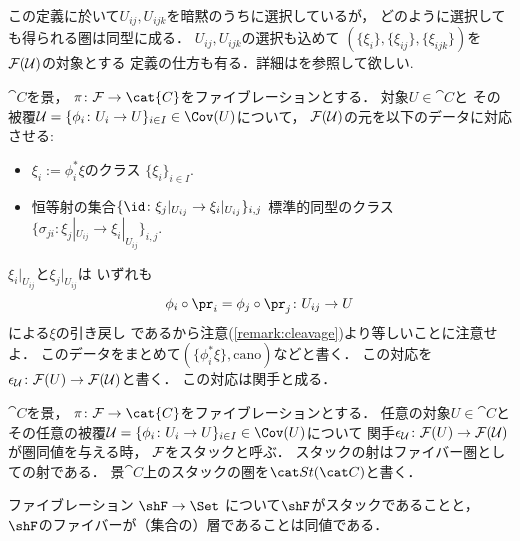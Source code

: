     \begin{Remark}
        この定義に於いて$U_{ij}, U_{ijk}$を暗黙のうちに選択しているが，
        どのように選択しても得られる圏は同型に成る．
        $U_{ij}, U_{ijk}$の選択も込めて
        $(\{\xi_i\}, \{\xi_{ij}\}, \{\xi_{ijk}\})$を$\mathcal{F}(\mathcal{U})$の対象とする
        定義の仕方も有る．詳細は\cite{FGAexp}を参照して欲しい.
    \end{Remark}

    \begin{Def}
        $\cat{C}$を景，
        $\pi \colon \stF \to \cat{C}$をファイブレーションとする．
        対象$U \in \cat{C}$と
        その被覆$\covU=\{\phi_i \colon U_i \to U\}_{i \in I} \in \Cov(U)$について，
        $\mathcal{F}(\mathcal{U})$の元を以下のデータに対応させる:
        \begin{itemize}
            \item $\xi_i:=\phi_i^*\xi$のクラス $\{\xi_i\}_{i \in I}$.
            \item
                恒等射の集合$\{ \id \colon \xi_j|_{U_{ij}} \to \xi_i|_{U_{ij}} \}_{i,j}$
                標準的同型のクラス $\{ \sigma_{ji} \colon \xi_j|_{U_{ij}} \to \xi_i|_{U_{ij}} \}_{i,j}$.
        \end{itemize}
        $\xi_i|_{U_{ij}}$と$\xi_j|_{U_{ij}}$は
        いずれも
        \[ \phi_i \circ \pr_i=\phi_j \circ \pr_j \colon U_{ij} \to U \]による$\xi$の引き戻し
        であるから注意(\ref{remark:cleavage})より等しいことに注意せよ．
        このデータをまとめて$(\{\phi_i^*\xi\}, \mathrm{cano})$などと書く．
        この対応を$\epsilon_{\mathcal{U}} \colon \mathcal{F}(U) \to \mathcal{F}(\mathcal{U})$と書く．
        この対応は関手と成る．
    \end{Def}

    \begin{Def}
        $\cat{C}$を景，
        $\pi \colon \stF \to \cat{C}$をファイブレーションとする．
        任意の対象$U \in \cat{C}$と
        その任意の被覆$\covU=\{\phi_i \colon U_i \to U\}_{i \in I} \in \Cov(U)$について
        関手$\epsilon_{\mathcal{U}} \colon \mathcal{F}(U) \to \mathcal{F}(\mathcal{U})$が圏同値を与える時，
        $\mathcal{F}$をスタックと呼ぶ．
        スタックの射はファイバー圏としての射である．
        景$\cat{C}$上のスタックの圏を$\St{C}$と書く．
    \end{Def}

    \begin{Example}
        ファイブレーション $\shF \to \Set$ について$\shF$がスタックであることと，
        $\shF$のファイバーが（集合の）層であることは同値である．
    \end{Example}

